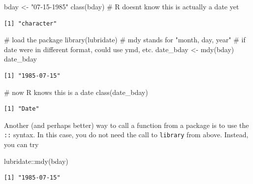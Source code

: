 \documentclass[
  letterpaper,
  DIV=11,
  numbers=noendperiod]{scrreprt}
\newenvironment{Shaded}{\begin{snugshade}}{\end{snugshade}}
\newcommand{\CommentTok}[1]{\textcolor[rgb]{0.37,0.37,0.37}{#1}}
\newcommand{\FunctionTok}[1]{\textcolor[rgb]{0.28,0.35,0.67}{#1}}
\newcommand{\NormalTok}[1]{\textcolor[rgb]{0.00,0.23,0.31}{#1}}
\newcommand{\OtherTok}[1]{\textcolor[rgb]{0.00,0.23,0.31}{#1}}
\newcommand{\SpecialCharTok}[1]{\textcolor[rgb]{0.37,0.37,0.37}{#1}}
\newcommand{\StringTok}[1]{\textcolor[rgb]{0.13,0.47,0.30}{#1}}
\begin{document}
\begin{Shaded}
\begin{Highlighting}[]
\NormalTok{bday }\OtherTok{\textless{}{-}} \StringTok{"07{-}15{-}1985"}
\FunctionTok{class}\NormalTok{(bday) }\CommentTok{\# R doesn\textquotesingle{}t know this is actually a date yet}
\end{Highlighting}
\end{Shaded}

\begin{verbatim}
[1] "character"
\end{verbatim}

\begin{Shaded}
\begin{Highlighting}[]
\CommentTok{\# load the package}
\FunctionTok{library}\NormalTok{(lubridate)}
\CommentTok{\# mdy stands for "month, day, year"}
\CommentTok{\# if date were in different format, could use ymd, etc.}
\NormalTok{date\_bday }\OtherTok{\textless{}{-}} \FunctionTok{mdy}\NormalTok{(bday)}
\NormalTok{date\_bday}
\end{Highlighting}
\end{Shaded}

\begin{verbatim}
[1] "1985-07-15"
\end{verbatim}

\begin{Shaded}
\begin{Highlighting}[]
\CommentTok{\# now R knows this is a date}
\FunctionTok{class}\NormalTok{(date\_bday)}
\end{Highlighting}
\end{Shaded}

\begin{verbatim}
[1] "Date"
\end{verbatim}

Another (and perhaps better) way to call a function from a package is to
use the \texttt{::} syntax. In this case, you do not need the call to
\texttt{library} from above. Instead, you can try

\begin{Shaded}
\begin{Highlighting}[]
\NormalTok{lubridate}\SpecialCharTok{::}\FunctionTok{mdy}\NormalTok{(bday)}
\end{Highlighting}
\end{Shaded}

\begin{verbatim}
[1] "1985-07-15"
\end{verbatim}
\end{document}
